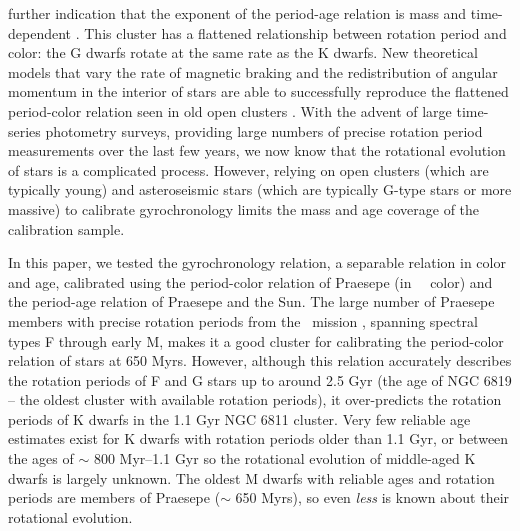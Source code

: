 further indication that the exponent of the period-age relation is mass and
time-dependent \citep{curtis2019 spada2019}.
This cluster has a flattened relationship between rotation period and
color: the G dwarfs rotate at the same rate as the K dwarfs.
New theoretical models that vary the rate of magnetic braking and the
redistribution of angular momentum in the interior of stars are able to
successfully reproduce the flattened period-color relation seen in old open
clusters \citep{spada2019}.
With the advent of large time-series photometry surveys, providing large
numbers of precise rotation period measurements over the last few years, we
now know that the rotational evolution of stars is a complicated process.
However, relying on open clusters (which are typically young) and
asteroseismic stars (which are typically G-type stars or more massive) to
calibrate gyrochronology limits the mass and age coverage of the calibration
sample.

In this paper, we tested the \citet{angus2019} gyrochronology relation, a
separable relation in color and age, calibrated using the period-color
relation of Praesepe (in \gaia\ \gcolor\ color) and the period-age relation of
Praesepe and the Sun.
The large number of Praesepe members with precise rotation periods from the
\ktwo\ mission \citep{douglas2017, rebull2017}, spanning spectral types F
through early M, makes it a good cluster for calibrating the period-color
relation of stars at 650 Myrs.
However, although this relation accurately describes the rotation periods of F
and G stars up to around 2.5 Gyr (the age of NGC 6819 -- the oldest cluster
with available rotation periods), it over-predicts the rotation periods of K
dwarfs in the 1.1 Gyr NGC 6811 cluster.
Very few reliable age estimates exist for K dwarfs with rotation periods older
than 1.1 Gyr, or between the ages of $\sim$ 800 Myr--1.1 Gyr so the rotational
evolution of middle-aged K dwarfs is largely unknown.
The oldest M dwarfs with reliable ages and rotation periods are members of
Praesepe ($\sim$ 650 Myrs), so even {\it less} is known about their rotational
evolution.

